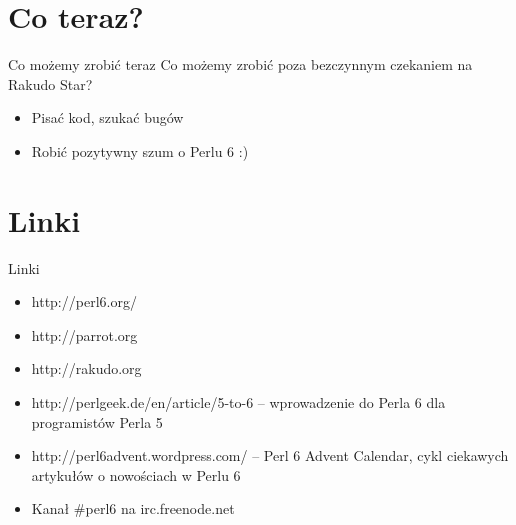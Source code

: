 \documentclass{beamer}
\begin{document}
			\section{Co teraz?}
\begin{frame}{Co możemy zrobić teraz}
	Co możemy zrobić poza bezczynnym czekaniem na Rakudo Star?
	\begin{itemize}
		\item Pisać kod, szukać bugów
		\item Robić pozytywny szum o Perlu 6 :)
	\end{itemize}
\end{frame}
			\section{Linki}

\begin{frame}{Linki}
	\begin{itemize}
		\item {}
			{http://perl6.org/}
		\item {}
			{http://parrot.org}
		\item {}
			{http://rakudo.org}
		\item
		{http://perlgeek.de/en/article/5-to-6}
		-- wprowadzenie do Perla 6 dla programistów Perla 5
		
		\item {}
			{http://perl6advent.wordpress.com/}
			-- Perl 6 Advent Calendar, cykl ciekawych artykułów o
			nowościach w Perlu 6
		\item Kanał \#perl6 na irc.freenode.net
	\end{itemize}
\end{frame}
\end{document}
